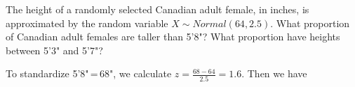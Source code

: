\begin{examp}\label{FemaleHeightsNormal} The height of a randomly selected Canadian adult female, in inches, is approximated by the random variable $X \sim Normal(64,2.5)$. What proportion of Canadian adult females are taller than 5'8"? What proportion have heights between 5'3" and 5'7"?
\par
\noindent To standardize 5'8"\,=\,68", we calculate $z = \frac{68 - 64}{2.5} = 1.6$. Then we have
\vspace{-1em}
\begin{center}
    \begin{minipage}{.5\textwidth}
        \centering
  \vspace{1.25em}
    \end{minipage}%
    \begin{minipage}{0.5\textwidth}
        \centering
\end{minipage}
\end{center}


\end{examp}
